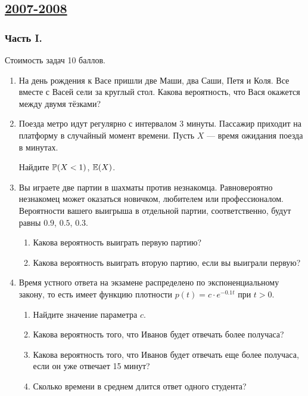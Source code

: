 


\newpage
\subsection[2007-2008]{\hyperref[sec:sol_kr_01_2007_2008]{2007-2008}}
\label{sec:kr_01_2007_2008}


\subsubsection*{Часть I.}

Стоимость задач 10 баллов.

\begin{enumerate}
\item На день рождения к Васе пришли две Маши, два Саши, Петя и Коля. Все вместе
с Васей сели за круглый стол. Какова вероятность, что Вася окажется между двумя тёзками?

\item Поезда метро идут регулярно с интервалом 3 минуты. Пассажир приходит на платформу
в случайный момент времени. Пусть $X$ — время ожидания поезда в минутах.

Найдите $\P(X<1)$, $\E(X)$.


\item Вы играете две партии в шахматы против незнакомца. Равновероятно незнакомец
может оказаться новичком, любителем или профессионалом. Вероятности вашего выигрыша
в отдельной партии, соответственно, будут равны $0.9$, $0.5$, $0.3$.
\begin{enumerate}
\item Какова вероятность выиграть первую партию?
\item Какова вероятность выиграть вторую партию, если вы выиграли первую?
\end{enumerate}

\item Время устного ответа на экзамене распределено по экспоненциальному закону,
то есть имеет функцию плотности $p(t) = c \cdot e^{-0.1t}$ при $t>0$.
\begin{enumerate}
\item Найдите значение параметра $c$.
\item Какова вероятность того, что Иванов будет отвечать более получаса?
\item Какова вероятность того, что Иванов будет отвечать еще более получаса,
если он уже отвечает 15 минут?
\item Сколько времени в среднем длится ответ одного студента?
\end{enumerate}


\end{enumerate}
